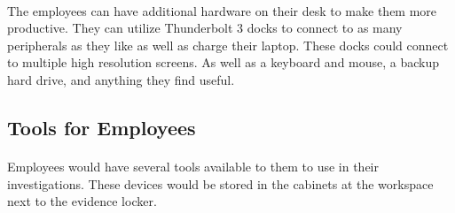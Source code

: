 \documentclass{article}
\begin{document}
\paragraph{}
The employees can have additional hardware on their desk to make them more productive.
They can utilize Thunderbolt 3 docks to connect to as many peripherals as they like as well as charge their laptop.
These docks could connect to multiple high resolution screens. As well as a keyboard and mouse, a backup hard drive, and anything they find useful.

 
\subsection{Tools for Employees} 
\paragraph{}
Employees would have several tools available to them to use in their investigations.
These devices would be stored in the cabinets at the workspace next to the evidence locker.
\end{document}
